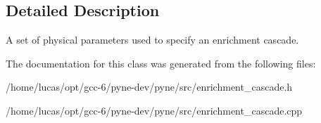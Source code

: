 \subsection{Detailed Description}
A set of physical parameters used to specify an enrichment cascade. 

The documentation for this class was generated from the following files\+:\begin{DoxyCompactItemize}
\item 
/home/lucas/opt/gcc-\/6/pyne-\/dev/pyne/src/enrichment\+\_\+cascade.\+h\item 
/home/lucas/opt/gcc-\/6/pyne-\/dev/pyne/src/enrichment\+\_\+cascade.\+cpp\end{DoxyCompactItemize}
